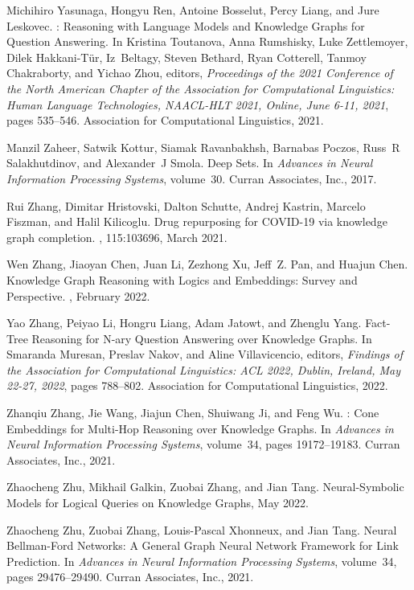 \documentclass[11pt]{article}
\begin{document}
\begin{thebibliography}{10}
Michihiro Yasunaga, Hongyu Ren, Antoine Bosselut, Percy Liang, and Jure
  Leskovec.
: {{Reasoning}} with {{Language Models}} and {{Knowledge
  Graphs}} for {{Question Answering}}.
\newblock In Kristina Toutanova, Anna Rumshisky, Luke Zettlemoyer, Dilek
  {Hakkani-T{\"u}r}, Iz~Beltagy, Steven Bethard, Ryan Cotterell, Tanmoy
  Chakraborty, and Yichao Zhou, editors, {\em Proceedings of the 2021
  {{Conference}} of the {{North American Chapter}} of the {{Association}} for
  {{Computational Linguistics}}: {{Human Language Technologies}}, {{NAACL-HLT}}
  2021, {{Online}}, {{June}} 6-11, 2021}, pages 535--546. {Association for
  Computational Linguistics}, 2021.

Manzil Zaheer, Satwik Kottur, Siamak Ravanbakhsh, Barnabas Poczos, Russ~R
  Salakhutdinov, and Alexander~J Smola.
\newblock Deep {{Sets}}.
\newblock In {\em Advances in {{Neural Information Processing Systems}}},
  volume~30. {Curran Associates, Inc.}, 2017.

Rui Zhang, Dimitar Hristovski, Dalton Schutte, Andrej Kastrin, Marcelo Fiszman,
  and Halil Kilicoglu.
\newblock Drug repurposing for {{COVID-19}} via knowledge graph completion.
, 115:103696, March 2021.

Wen Zhang, Jiaoyan Chen, Juan Li, Zezhong Xu, Jeff~Z. Pan, and Huajun Chen.
\newblock Knowledge {{Graph Reasoning}} with {{Logics}} and {{Embeddings}}:
  {{Survey}} and {{Perspective}}.
, February 2022.

Yao Zhang, Peiyao Li, Hongru Liang, Adam Jatowt, and Zhenglu Yang.
\newblock Fact-{{Tree Reasoning}} for {{N-ary Question Answering}} over
  {{Knowledge Graphs}}.
\newblock In Smaranda Muresan, Preslav Nakov, and Aline Villavicencio, editors,
  {\em Findings of the {{Association}} for {{Computational Linguistics}}:
  {{ACL}} 2022, {{Dublin}}, {{Ireland}}, {{May}} 22-27, 2022}, pages 788--802.
  {Association for Computational Linguistics}, 2022.

Zhanqiu Zhang, Jie Wang, Jiajun Chen, Shuiwang Ji, and Feng Wu.
: {{Cone Embeddings}} for {{Multi-Hop Reasoning}} over
  {{Knowledge Graphs}}.
\newblock In {\em Advances in {{Neural Information Processing Systems}}},
  volume~34, pages 19172--19183. {Curran Associates, Inc.}, 2021.

Zhaocheng Zhu, Mikhail Galkin, Zuobai Zhang, and Jian Tang.
\newblock Neural-{{Symbolic Models}} for {{Logical Queries}} on {{Knowledge
  Graphs}}, May 2022.

Zhaocheng Zhu, Zuobai Zhang, Louis-Pascal Xhonneux, and Jian Tang.
\newblock Neural {{Bellman-Ford Networks}}: {{A General Graph Neural Network
  Framework}} for {{Link Prediction}}.
\newblock In {\em Advances in {{Neural Information Processing Systems}}},
  volume~34, pages 29476--29490. {Curran Associates, Inc.}, 2021.

\end{thebibliography}
\end{document}
